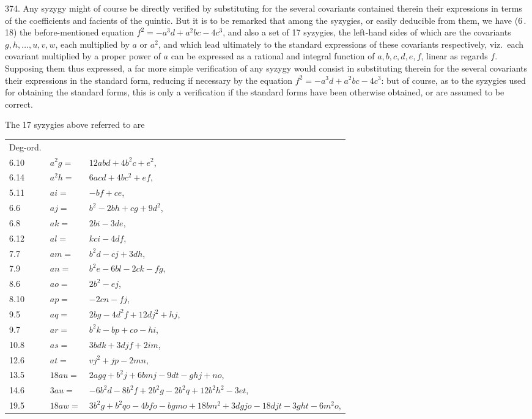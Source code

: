 \documentclass[11pt]{article}
\begin{document}
374. Any syzygy might of course be directly verified by substituting for the several covariants contained therein their expressions in terms of the coefficients and facients of the quintic. But it is to be remarked that among the syzygies, or easily deducible from them, we have (6\,.\,18) the before-mentioned equation $f^{2} = -a^{3}d + a^{2}bc - 4c^{3}$, and also a set of 17 syzygies, the left-hand sides of which are the covariants $g, h, \ldots, u, v, w$, each multiplied by $a$ or $a^{2}$, and which lead ultimately to the standard expressions of these covariants respectively, viz.\ each covariant multiplied by a proper power of $a$ can be expressed as a rational and integral function of $a, b, c, d, e, f$, linear as regards $f$. Supposing them thus expressed, a far more simple verification of any syzygy would consist in substituting therein for the several covariants their expressions in the standard form, reducing if necessary by the equation $f^{2} = -a^{3}d + a^{2}bc - 4c^{3}$: but of course, as to the syzygies used for obtaining the standard forms, this is only a verification if the standard forms have been otherwise obtained, or are assumed to be correct.


\noindent The 17 syzygies above referred to are

\medskip

\begin{center}
\begin{tabular}{lll}
Deg-ord. & & \\
6.10 & $a^{2}g =$ & $12abd + 4b^{2}c + e^{2}$, \\
6.14 & $a^{2}h =$ & $6acd + 4bc^{2} + ef$, \\
5.11 & $ai =$ & $-bf + ce$, \\
6.6 & $aj =$ & $b^{2} - 2bh + cg + 9d^{2}$, \\
6.8 & $ak =$ & $2bi - 3de$, \\
6.12 & $al =$ & $kci - 4df$, \\
7.7 & $am =$ & $b^{2}d - cj + 3dh$, \\
7.9 & $an =$ & $b^{2}e - 6bl - 2ck - fg$, \\
8.6 & $ao =$ & $2b^{2} - ej$, \\
8.10 & $ap =$ & $-2cn - fj$, \\
9.5 & $aq =$ & $2bg - 4d^{2}f + 12dj^{2} + hj$, \\
9.7 & $ar =$ & $b^{2}k - bp + co - hi$, \\
10.8 & $as =$ & $3bdk + 3djf + 2im$, \\
12.6 & $at =$ & $vj^{2} + jp - 2mn$, \\
13.5 & $18au =$ & $2agq + b^{2}j + 6bmj - 9dt - ghj + no$, \\
14.6 & $3au =$ & $-6b^{2}d - 8b^{2}f + 2b^{2}g - 2b^{2}q + 12b^{2}h^{2} - 3et$, \\
19.5 & $18aw =$ & $3b^{2}g + b^{2}qo - 4bfo - bgmo + 18bm^{2} + 3dgjo - 18djt - 3ght - 6m^{2}o$,\\
\end{tabular}
\end{center}
\end{document}
